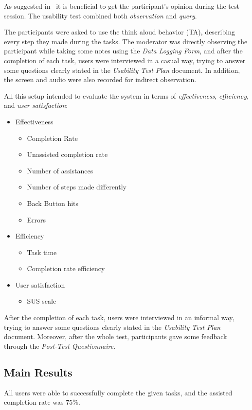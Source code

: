 \documentclass[a4paper]{article}
\begin{document}
As suggested in~\citep{mitchell2007step} it is beneficial to get the participant's opinion during the test session.
The usability test combined both \emph{observation} and \textit{query}.

The participants were asked to use the think aloud behavior (TA), describing every step they made during the tasks.
The moderator was directly observing the participant while taking some notes using the \emph{Data Logging Form}, and after the completion of each task, users were interviewed in a casual way, trying to answer some questions clearly stated in the \emph{Usability Test Plan} document.
In addition, the screen and audio were also recorded for indirect observation.
 
All this setup intended to evaluate the system in terms of \emph{effectiveness}, \emph{efficiency}, and \emph{user satisfaction}:
 
 \begin{itemize}
   \item Effectiveness
   \begin{itemize}
     \item Completion Rate
     \item Unassisted completion rate
     \item Number of assistances
     \item Number of steps made differently
     \item Back Button hits
     \item Errors
   \end{itemize}
   \item Efficiency
   \begin{itemize}
     \item Task time
     \item Completion rate efficiency
   \end{itemize}
   \item User satisfaction
   \begin{itemize}
     \item SUS scale
   \end{itemize}
 \end{itemize}
 
 After the completion of each task, users were interviewed in an informal way, trying to answer some questions clearly stated in the \emph{Usability Test Plan} document. Moreover, after the whole test, participants gave some feedback through the \emph{Post-Test Questionnaire}.
 
 
 \subsection{Main Results}
All users were able to successfully complete the given tasks, and the assisted completion rate was 75\%.
\end{document}
